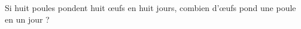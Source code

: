 
\begin{exercice}\label{exo2smath-0117}

    Si huit poules pondent huit œufs en huit jours, combien d'œufs pond une poule en un jour ?

\end{exercice}
